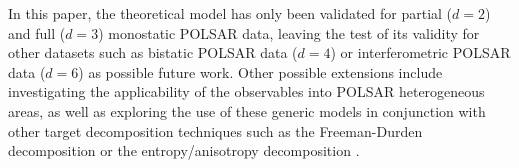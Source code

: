 \documentclass[journal]{IEEEtran}
\begin{document}
In this paper, the theoretical model has only been validated for partial ($d=2$) and full ($d=3$) monostatic POLSAR data,
  leaving the test of its validity for other datasets such as bistatic POLSAR data ($d=4$) or interferometric POLSAR data ($d=6$) as possible future work.
Other possible extensions include
  investigating the applicability of the observables into POLSAR heterogeneous areas,
  as well as exploring the use of these generic models in conjunction with other target decomposition techniques
    such as the Freeman-Durden decomposition \cite{Freeman_1998_TGRS_963} or the entropy/anisotropy decomposition \cite{Cloude_1997_TGRS_68}.  



\end{document}
